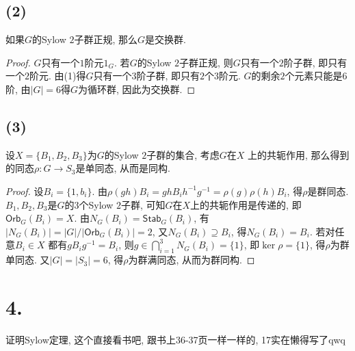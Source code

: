 \documentclass[12pt, a4paper, fontset=windows]{ctexart}
\newcommand{\Orb}{\mathsf{Orb}}
\newcommand{\Stab}{\mathsf{Stab}}
\newcommand{\abs}[1]{\left|{#1}\right|}
\begin{document}
\subsection*{(2)}

如果$G$的Sylow $2$子群正规, 那么$G$是交换群. 

\begin{proof}
$G$只有一个$1$阶元$1_G$. 
若$G$的Sylow $2$子群正规, 则$G$只有一个$2$阶子群, 
即只有一个$2$阶元. 由(1)得$G$只有一个$3$阶子群, 
即只有$2$个$3$阶元. $G$的剩余$2$个元素只能是$6$阶, 
由$\abs{G}=6$得$G$为循环群, 因此为交换群. 
\end{proof}

\subsection*{(3)}

设$X=\{B_1,B_2,B_3\}$为$G$的Sylow $2$子群的集合, 考虑$G$在$X$
上的共轭作用, 那么得到的同态$\rho:G\to S_3$是单同态, 从而是同构. 

\begin{proof}
设$B_i=\{1,b_i\}$. 
由$\rho(gh)B_i=ghB_ih^{-1}g^{-1}=\rho(g)\rho(h)B_i$, 得$\rho$是群同态. 
$B_1,B_2,B_3$是$G$的$3$个Sylow $2$子群, 可知$G$在$X$上的共轭作用是传递的, 即$\Orb_{G}(B_i)=X$. 
由$N_G(B_i)=\Stab_{G}(B_i)$, 有$\abs{N_G(B_i)}=\abs{G}/\abs{\Orb_{G}(B_i)}=2$, 
又$N_G(B_i)\supseteq B_i$, 得$N_G(B_i)=B_i$. 若对任意$B_i\in X$
都有$gB_ig^{-1}=B_i$, 则$g\in\bigcap^3_{i=1}N_G(B_i)=\{1\}$, 
即$\ker\rho=\{1\}$, 得$\rho$为群单同态. 又$\abs{G}=\abs{S_3}=6$, 
得$\rho$为群满同态, 从而为群同构. 
\end{proof}

\section*{4.}

证明Sylow定理, 这个直接看书吧, 跟书上36-37页\cite{jsds}一样一样的, 17实在懒得写了{\sf qwq}

\clearpage
\end{document}
